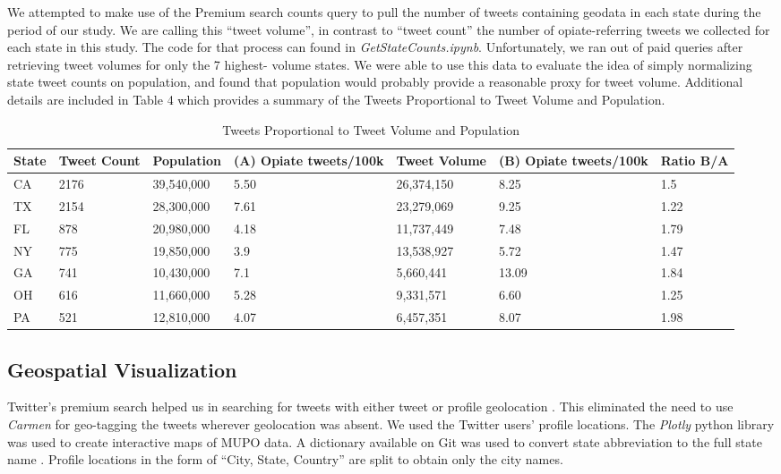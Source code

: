 \documentclass[sigconf]{acmart}
\begin{document}
We attempted to make use of the Premium search counts query to pull the number 
of tweets containing geodata in each state during the period of our study. 
We are calling this ``tweet volume'', in contrast to ``tweet count'' the number 
of opiate-referring tweets we collected for each state in this study. The code 
for that process can found in \emph{GetStateCounts.ipynb}. Unfortunately, we 
ran out of paid queries after retrieving tweet volumes for only the 7 highest-
volume states. We were able to use this data to evaluate the idea of simply 
normalizing state tweet counts on population, and found that population would 
probably provide a reasonable proxy for tweet volume. Additional details are 
included in Table 4 which provides a summary of the Tweets Proportional to 
Tweet Volume and Population.

\begin{table}[ht]
\centering
\caption{Tweets Proportional to Tweet Volume and Population}
\label{tab:1}
  \begin{tabular}{lllllll}
    \toprule
    State & Tweet Count & Population & (A) Opiate tweets/100k & Tweet Volume & 
    (B) Opiate tweets/100k & Ratio B/A \\
    \midrule     
    CA& 2176& 39,540,000& 5.50& 26,374,150& 8.25& 1.5 \\
    TX& 2154& 28,300,000& 7.61& 23,279,069& 9.25& 1.22 \\
    FL& 878& 20,980,000& 4.18& 11,737,449& 7.48& 1.79 \\
    NY& 775& 19,850,000& 3.9& 13,538,927& 5.72& 1.47 \\
    GA& 741& 10,430,000& 7.1& 5,660,441& 13.09& 1.84 \\
    OH& 616& 11,660,000& 5.28& 9,331,571& 6.60 & 1.25 \\
    PA& 521& 12,810,000& 4.07& 6,457,351& 8.07& 1.98 \\	
    \bottomrule
  \end{tabular}
\end{table}


\subsection{Geospatial Visualization}

Twitter's premium search helped us in searching for tweets with either
tweet or profile geolocation \cite{twittergeo}. This eliminated the need to use 
\emph{Carmen} \cite{dredze13} for geo-tagging the tweets wherever geolocation 
was absent. We used the Twitter users' profile locations. The \emph{Plotly} python 
library was used to create interactive maps of MUPO data. A dictionary available on 
Git was used to convert state abbreviation to the full state name \cite{CodeRef1}. 
Profile locations in the form of ``City, State, Country'' are split to obtain 
only the city names. 
\end{document}
